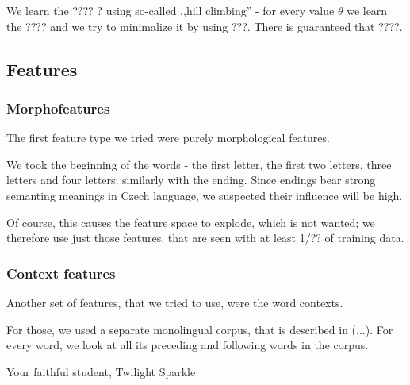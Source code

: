 We learn the ???? $?$ using so-called ,,hill climbing'' - for every value $\theta$ we learn the ???? and we try to minimalize it by using ???. There is guaranteed that ????.

\subsection{Features}
\subsubsection{Morphofeatures}
The first feature type we tried were purely morphological features.

We took the beginning of the words - the first letter, the first two letters, three letters and four letters; similarly with the ending. Since endings bear strong semanting meanings in Czech language, we suspected their influence will be high.

Of course, this causes the feature space to explode, which is not wanted; we therefore use just those features, that are seen with at least 1/?? of training data.

\subsubsection{Context features}
Another set of features, that we tried to use, were the word contexts.

For those, we used a separate monolingual corpus, that is described in (...). For every word, we look at all its preceding and following words in the corpus.

Your faithful student,
Twilight Sparkle

